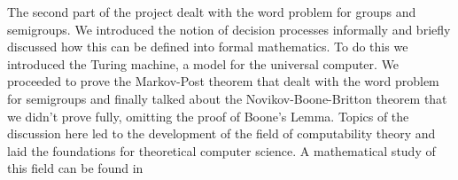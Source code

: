 \documentclass[12pt]{report}
\theoremstyle{definition}
\numberwithin{equation}{theorem}
\begin{document}
The second part of the project dealt with the word problem for groups and semigroups. We introduced the notion of decision processes informally and briefly discussed how this can be defined into formal mathematics. To do this we introduced the Turing machine, a model for the universal computer. We proceeded to prove the Markov-Post theorem that dealt with the word problem for semigroups and finally talked about the Novikov-Boone-Britton theorem that we didn't prove fully, omitting the proof of Boone's Lemma. Topics of the discussion here led to the development of the field of computability theory and laid the foundations for theoretical computer science. A mathematical study of this field can be found in \cite{bridges1994}



\end{document}
